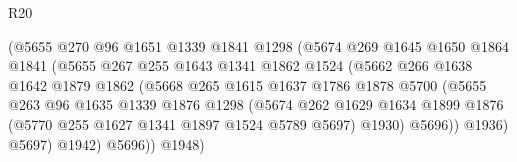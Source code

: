 \begin{lexlean}{R20}
\begin{coremodule}
                                  (@5655
                                    @270
                                    @96
                                    @1651
                                    @1339
                                    @1841
                                    @1298
                                    (@5674
                                      @269
                                      @1645
                                      @1650
                                      @1864
                                      @1841
                                      (@5655
                                        @267
                                        @255
                                        @1643
                                        @1341
                                        @1862
                                        @1524
                                        (@5662
                                          @266
                                          @1638
                                          @1642
                                          @1879
                                          @1862
                                          (@5668
                                            @265
                                            @1615
                                            @1637
                                            @1786
                                            @1878
                                            @5700
                                            (@5655
                                              @263
                                              @96
                                              @1635
                                              @1339
                                              @1876
                                              @1298
                                              (@5674
                                                @262
                                                @1629
                                                @1634
                                                @1899
                                                @1876
                                                (@5770 @255 @1627 @1341 @1897 @1524 @5789 @5697)
                                                @1930)
                                              @5696))
                                          @1936)
                                        @5697)
                                      @1942)
                                    @5696))
                                @1948)

\end{coremodule}
\end{lexlean}
